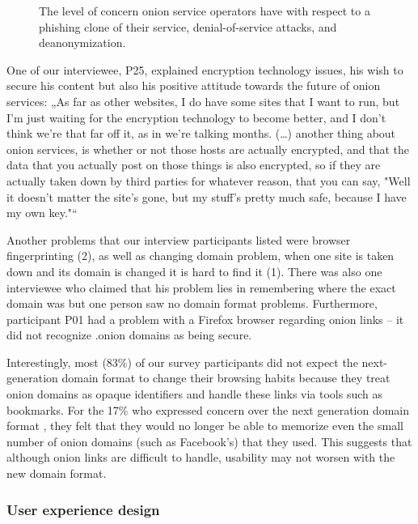 \begin{figure}[t]
    \centering
    
    \caption{The level of concern onion service operators have with respect to a
    phishing clone of their service, denial-of-service attacks, and
    deanonymization.}
    \label{fig:onion-operation-concerns}
\end{figure}

One of our interviewee, P25, explained encryption technology issues, his wish to secure his content but also his positive attitude towards the future of onion services: „As far as other websites, I do have some sites that I want to run, but I'm just waiting for the encryption technology to become better, and I don't think we're that far off it, as in we're talking months. (…) another thing about onion services, is whether or not those hosts are actually encrypted, and that the data that you actually post on those things is also encrypted, so if they are actually taken down by third parties for whatever reason, that you can say, "Well it doesn't matter the site's gone, but my stuff's pretty much safe, because I have my own key."“

Another problems that our interview participants listed were browser fingerprinting (2), as well as changing domain problem, when one site is taken down and its domain is changed it is hard to find it (1). There was also one interviewee who claimed that his problem lies in remembering where the exact domain was but one person saw no domain format problems. Furthermore, participant P01 had a problem with a Firefox  browser regarding onion links – it did not recognize .onion domains as being secure. 

Interestingly, most (83\%) of our survey participants did not expect the
next-generation domain format to change their browsing habits because they treat onion domains as
opaque identifiers and handle these links via tools such as bookmarks.  For the 17\% who expressed concern over the next generation domain format , they felt that they would no longer be able to memorize even the small
number of onion domains (such as Facebook's) that they used.
 This suggests that although onion links are difficult to handle, usability may not worsen with the new domain format.


\subsubsection{User experience design}


